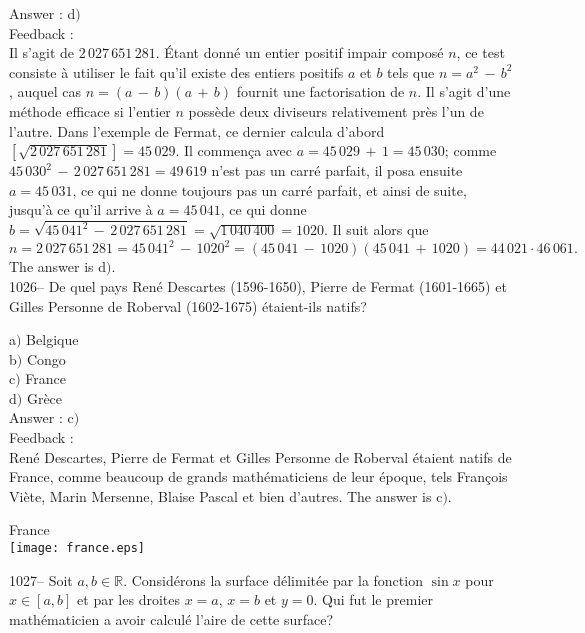 \documentclass[letterpaper, 12pt]{article}
\begin{document}
Answer : d$)$\\

Feedback : \\
Il s'agit de $2\,027\,651\,281$. \'Etant donn\'e un entier positif
impair compos\'e $n$, ce test consiste \`a utiliser le fait qu'il
existe des entiers positifs $a$ et $b$ tels que $n=a^2\,-\,b^2$,
auquel cas $n=(a\,-\,b)(a\,+\,b)$ fournit une factorisation de $n$.
Il s'agit d'une m\'ethode efficace si l'entier $n$ poss\`ede deux
diviseurs relativement pr\`es l'un de l'autre. Dans l'exemple de
Fermat, ce dernier calcula d'abord $[\sqrt{
2\,027\,651\,281}]=45\,029$. Il commen\c ca avec
$a=45\,029\,+\,1=45\,030$; comme
$45\,030^2\,-\,2\,027\,651\,281=49\,619$ n'est pas un carr\'e
parfait, il posa ensuite $a=45\,031$, ce qui ne donne toujours pas
un carr\'e parfait, et ainsi de suite, jusqu'\`a ce qu'il arrive \`a
$a=45\,041$, ce qui donne
$b=\sqrt{45\,041^2\,-\,2\,027\,651\,281}=\sqrt{1\,040\,400}=1020$.
Il suit alors que
$$n=2\,027\,651\,281=45\,041^2\,-\,1020^2=(45\,041\,-\,1020)(45\,041\,+\,1020)=44\,021\cdot46\,061.$$
The answer is d$)$.\\

1026-- De quel pays Ren\'e Descartes (1596-1650), Pierre de Fermat
(1601-1665) et Gilles Personne de Roberval (1602-1675) \'etaient-ils
natifs?

a$)$ Belgique  \\
b$)$ Congo \\
c$)$ France  \\
d$)$ Gr\`ece\\

Answer : c$)$\\

Feedback :\\
Ren\'e Descartes, Pierre de Fermat et Gilles Personne de Roberval
\'etaient natifs de France, comme beaucoup de grands
math\'ematiciens de leur \'epoque, tels Fran\c cois Vi\`ete, Marin
Mersenne, Blaise Pascal et bien d'autres. The answer is c$)$.

        \begin{center}
        France\\
    \texttt{[image: france.eps]}\\
    \end{center}

1027-- Soit $a,b\in\mathbb{R}$. Consid\'erons la surface
d\'elimit\'ee par la fonction $\sin x$ pour $x\in[a,b]$ et par les
droites $x=a$, $x=b$ et $y=0$. Qui fut le premier math\'ematicien a
avoir calcul\'e l'aire de cette surface?
\end{document}
